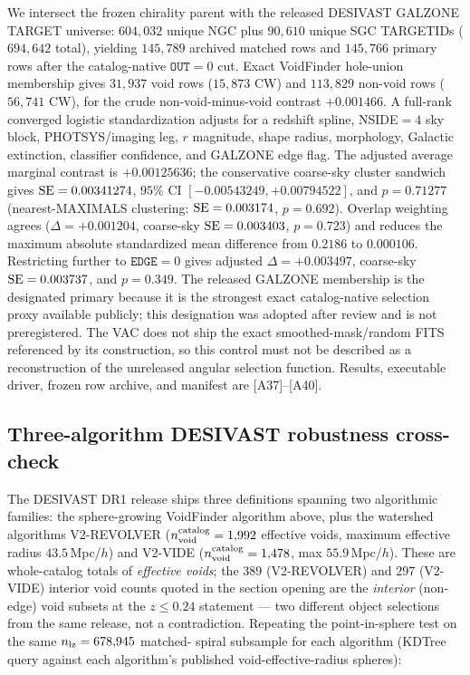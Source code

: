 \documentclass[aps,prd,twocolumn,superscriptaddress,showpacs,preprintnumbers,nofootinbib,longbibliography,floatfix]{revtex4-2}
\begin{document}
We
intersect the frozen chirality parent with the released DESIVAST GALZONE
TARGET universe: $604{,}032$ unique NGC plus $90{,}610$ unique SGC TARGETIDs
($694{,}642$ total), yielding $145{,}789$ archived matched rows and
$145{,}766$ primary rows after the catalog-native $\mathtt{OUT}=0$ cut.
Exact VoidFinder hole-union membership gives $31{,}937$ void rows
($15{,}873$ CW) and $113{,}829$ non-void rows ($56{,}741$ CW), for the crude
non-void-minus-void contrast $+0.001466$. A full-rank converged logistic
standardization adjusts for a redshift spline, NSIDE$=4$ sky block,
PHOTSYS/imaging leg, $r$ magnitude, shape radius, morphology, Galactic
extinction, classifier confidence, and GALZONE edge flag. The adjusted
average marginal contrast is $+0.00125636$; the conservative coarse-sky
cluster sandwich gives ${\rm SE}=0.00341274$, $95\%$ CI
$[-0.00543249,+0.00794522]$, and $p=0.71277$ (nearest-MAXIMALS clustering:
${\rm SE}=0.003174$, $p=0.692$). Overlap weighting agrees
($\Delta=+0.001204$, coarse-sky ${\rm SE}=0.003403$, $p=0.723$) and reduces
the maximum absolute standardized mean difference from $0.2186$ to
$0.000106$. Restricting further to $\mathtt{EDGE}=0$ gives adjusted
$\Delta=+0.003497$, coarse-sky ${\rm SE}=0.003737$, and $p=0.349$.
The released GALZONE membership is the designated primary because it is
the strongest exact catalog-native selection proxy available publicly;
this designation was adopted after review and is not preregistered. The
VAC does not ship the exact
smoothed-mask/random FITS referenced by its construction, so this control
must not be described as a reconstruction of the unreleased angular
selection function. Results, executable driver, frozen row archive, and
manifest are [A37]--[A40].

\subsection{Three-algorithm DESIVAST robustness cross-check}\label{sec:desivast_three_algo}

The DESIVAST DR1 release ships three definitions spanning two algorithmic families: the
sphere-growing VoidFinder algorithm above, plus the watershed
algorithms V2-REVOLVER ($n_{\rm void}^{\rm catalog} = 1{,}992$ effective
voids, maximum effective radius $43.5\,$Mpc/$h$) and V2-VIDE
($n_{\rm void}^{\rm catalog} = 1{,}478$, max $55.9\,$Mpc/$h$). These are
whole-catalog totals of \emph{effective voids}; the $389$ (V2-REVOLVER)
and $297$ (V2-VIDE) interior void counts quoted in the section opening are the
\emph{interior} (non-edge) void subsets at the $z \le 0.24$ statement
— two different object selections from the same release, not a
contradiction. Repeating
the point-in-sphere test on the same $n_{\rm lz} = 678{,}945$ matched-
spiral subsample for each algorithm (KDTree query against each
algorithm's published void-effective-radius spheres):
\end{document}
